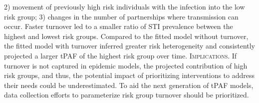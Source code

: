 2) movement of previously high risk individuals with the infection into the low risk group;
3) changes in the number of partnerships where transmission can occur.				%
Faster turnover led to
a smaller ratio of STI prevalence between the highest and lowest risk groups.
Compared to the fitted model without turnover,
the fitted model with turnover inferred greater risk heterogeneity
and consistently projected a larger tPAF of the highest risk group over time.			%
\textsc{Implications.}
If turnover is not captured in epidemic models,
the projected contribution of high risk groups, and thus,
the potential impact of prioritizing interventions to address their needs could be underestimated.
To aid the next generation of tPAF models,
data collection efforts to parameterize risk group turnover should be prioritized.